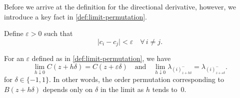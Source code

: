 Before we arrive at the definition for the directional derivative, however,
we introduce a key fact in \cref{def:limit-permutation}.

\begin{definition}
  \label{def:limit-permutation}
  Define \(\varepsilon > 0\) such that
  \begin{equation*}
    \big| c_i - c_j\big| < \varepsilon \quad \forall\, i \neq j.
  \end{equation*}
\end{definition}

For an \(\varepsilon\) defined as in \cref{def:limit-permutation}, we have
\begin{equation}
  \lim_{h \downarrow 0} C(z + h\delta) = C(z + \varepsilon \delta)
  \quad\text{and}\quad
  \lim_{h \downarrow 0} \lambda_{(i)^-_{z + h\delta}}
  = \lambda_{(i)^-_{z + \varepsilon\delta}}.
\end{equation}
for \(\delta \in \{-1, 1\}\).
In other words, the order permutation corresponding to \(B(z + h\delta)\) depends only on
\(\delta\) in the limit as \(h\) tends to~\(0\).

